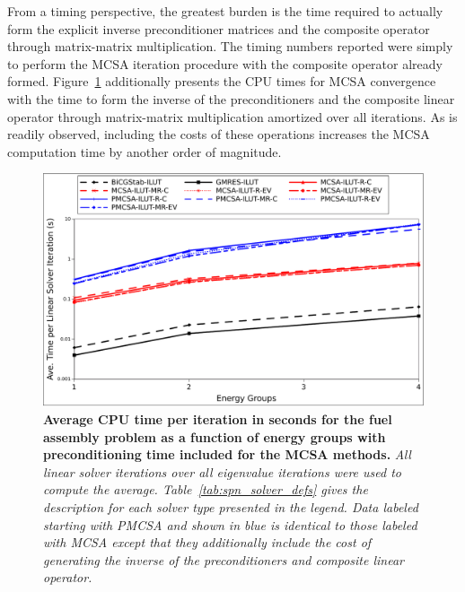 \documentclass[letterpaper,12pt]{article}
\begin{document}
From a timing perspective, the greatest burden is the time required to
actually form the explicit inverse preconditioner matrices and the
composite operator through matrix-matrix multiplication. The timing
numbers reported were simply to perform the MCSA iteration procedure
with the composite operator already
formed. Figure~\ref{fig:spn_comparison_time} additionally presents the
CPU times for MCSA convergence with the time to form the inverse of
the preconditioners and the composite linear operator through
matrix-matrix multiplication amortized over all iterations. As is
readily observed, including the costs of these operations increases
the MCSA computation time by another order of magnitude.

\begin{figure}[t!]
  \begin{center}
    \includegraphics[width=5in]{solver_p_time.pdf}
  \end{center}
  \caption{\textbf{Average CPU time per iteration in seconds for the
      fuel assembly problem as a function of energy groups with
      preconditioning time included for the MCSA methods.}
    \textit{All linear solver iterations over all eigenvalue
      iterations were used to compute the
      average. Table~\ref{tab:spn_solver_defs} gives the description
      for each solver type presented in the legend. Data labeled
      starting with PMCSA and shown in blue is identical to those
      labeled with MCSA except that they additionally include the cost
      of generating the inverse of the preconditioners and composite
      linear operator.}}
  \label{fig:spn_comparison_time}
\end{figure}
\end{document}
